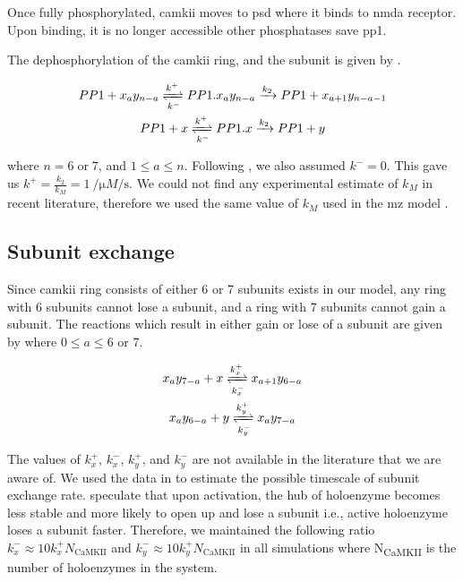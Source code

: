 \documentclass[9pt,lineno,doublespacing]{elife}
\newcommand\SUB[2]{#1\textsubscript{#2}}
\begin{document}
{Once fully phosphorylated, \gls{camkii} moves to \gls{psd} where it binds to
\gls{nmda} receptor. Upon binding, it is no longer accessible other phosphatases
save \gls{pp1}.

The dephosphorylation of the \gls{camkii} ring, and the subunit is given by
.

\begin{equation}\label{eq:dephosphorylation} 
    \begin{gathered} 
        PP1 + x_ay_{n-a} \xrightleftharpoons[k^-]{k^+} PP1.x_ay_{n-a} 
            \xrightarrow{k_2} PP1 + x_{a+1}y_{n-a-1} \\ 
        PP1 + x \xrightleftharpoons[k^-]{k^+} PP1.x \xrightarrow{k_2} PP1 + y 
    \end{gathered}
\end{equation}

\noindent where $n=6\;\text{or}\;7$, and $1\le a \le n$. Following
\cite{miller_stability_2005}, we also assumed $k^-=0$. This gave us
$k^+=\frac{k_2}{k_M}=\SI{1}{\per\micro M\per\second}$. We could not find any
experimental estimate of $k_M$ in recent literature, therefore we used the same
value of $k_M$ used in the \gls{mz} model \citep{miller_stability_2005}.

\subsection{Subunit exchange}\label{subunit exchange} 

Since \gls{camkii} ring consists of either 6 or 7 subunits exists in our model,
any ring with 6 subunits cannot lose a subunit, and a ring with 7 subunits
cannot gain a subunit. The reactions which result in either gain or lose of a
subunit are given by  where $0\le a \le 6\text{ or }7$.

\begin{equation}\label{eq:losegainx}
    \begin{gathered}
    x_ay_{7-a} + x \xrightleftharpoons[k^-_x]{k^+_x} x_{a+1}y_{6-a} \\
    x_ay_{6-a} + y \xrightleftharpoons[k^-_y]{k^+_y} x_{a}y_{7-a}
    \end{gathered}
\end{equation}

The values of $k_x^+$, $k_x^-$, $k_y^+$, and $k_y^-$ are not available in the
literature that we are aware of. We used the data in
\cite{stratton_activation-triggered_2014} to estimate the possible timescale of
subunit exchange rate. \cite{bhattacharyya_molecular_2016} speculate that upon
activation, the hub of holoenzyme becomes less stable and more likely to open up
and lose a subunit i.e., active holoenzyme loses a subunit faster. Therefore, we
maintained the following ratio \(k_x^- \approx 10 k_x^+ N_{\text{CaMKII}}\) and
\(k_y^- \approx 10 k_y^+ N_{\text{CaMKII}}\) in all simulations where
\SUB{N}{CaMKII} is the number of holoenzymes in the system.

}
\end{document}
